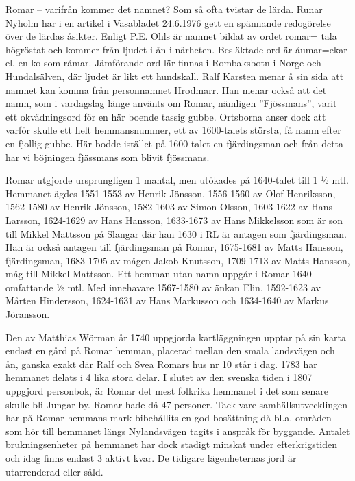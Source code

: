 
Romar – varifrån kommer det namnet? Som så ofta tvistar de lärda. Runar Nyholm har i en artikel i Vasabladet 24.6.1976 gett en spännande redogörelse över de lärdas åsikter. Enligt P.E. Ohls är namnet bildat av ordet romar= tala högröstat och kommer från ljudet i ån i närheten. Besläktade ord är åumar=ekar el. en ko som råmar. Jämförande ord lär finnas i Rombaksbotn i Norge och Hundalsälven, där ljudet är likt ett hundskall. Ralf Karsten menar å sin sida att namnet kan komma från personnamnet Hrodmarr. Han menar också att det namn, som i vardagslag länge använts om Romar, nämligen ”Fjössmans”, varit ett okvädningsord för en här boende tassig gubbe. Ortsborna anser dock att varför skulle ett helt hemmansnummer, ett av 1600-talets största, få namn efter en fjollig gubbe. Här bodde istället på 1600-talet en fjärdingsman och från detta har vi böjningen fjässmans som blivit fjössmans.

Romar utgjorde ursprungligen 1 mantal, men utökades på 1640-talet till 1 ½ mtl. Hemmanet ägdes 1551-1553 av Henrik Jönsson,  1556-1560 av Olof Henriksson, 1562-1580 av Henrik Jönsson, 1582-1603 av Simon Olsson, 1603-1622 av Hans Larsson, 1624-1629 av Hans Hansson, 1633-1673 av Hans Mikkelsson som är son till Mikkel Mattsson på Slangar där han 1630 i RL är antagen som fjärdingsman. Han är också antagen till fjärdingsman på Romar, 1675-1681 av Matts Hansson, fjärdingsman, 1683-1705 av mågen  Jakob Knutsson, 1709-1713 av Matts Hansson, måg till Mikkel Mattsson. Ett hemman utan namn uppgår i Romar 1640 omfattande ½ mtl. Med innehavare 1567-1580 av änkan Elin, 1592-1623 av Mårten Hindersson, 1624-1631 av Hans Markusson och 1634-1640 av Markus Jöransson.

Den av Matthias Wörman år 1740 uppgjorda kartläggningen upptar på sin karta endast en gård på Romar hemman, placerad mellan den smala landsvägen och ån, ganska exakt där Ralf och Svea Romars hus nr 10 står i dag.  1783 har hemmanet delats i 4 lika stora delar. I slutet av den svenska tiden i 1807 uppgjord personbok, är Romar det mest folkrika hemmanet i det som senare  skulle bli Jungar by.  Romar hade då 47 personer. Tack vare samhällsutvecklingen har på Romar hemmans mark bibehållits en god bosättning då bl.a. områden som hör till hemmanet längs Nylandsvägen tagits i anspråk för byggande. Antalet brukningsenheter på hemmanet har dock stadigt minskat under efterkrigstiden och idag finns endast 3 aktivt kvar. De tidigare lägenheternas jord är utarrenderad eller såld.

